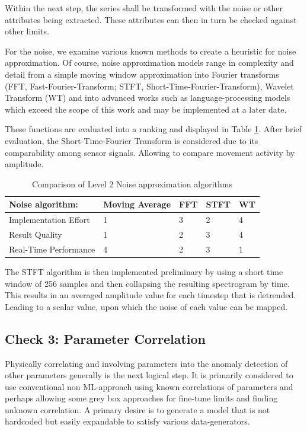 Within the next step, the series shall be transformed with the noise or other attributes being extracted. These attributes can then in turn be checked against other limits.

For the noise, we examine various known methods to create a heuristic for noise approximation. Of course, noise approximation models range in complexity and detail from a simple moving window approximation into Fourier transforms (FFT, Fast-Fourier-Transform; STFT, Short-Time-Fourier-Transform), Wavelet Transform (WT) and into advanced works such as language-processing models \cite{hendriks_noise_2008} which exceed the scope of this work and may be implemented at a later date.

These functions are evaluated into a ranking and displayed in Table \ref{tab:lvl2_comparison}. After brief evaluation, the Short-Time-Fourier Transform is considered due to its comparability among sensor signals. Allowing to compare movement activity by amplitude.

\begin{table}[]
    \centering
    \begin{tabular}{@{}lllll@{}}
        \toprule
        Noise algorithm:      & Moving Average & FFT & STFT & WT \\ \midrule
        Implementation Effort & 1              & 3   & 2    & 4  \\
        Result Quality        & 1              & 2   & 3    & 4  \\
        Real-Time Performance & 4              & 2   & 3    & 1  \\ \bottomrule
    \end{tabular}
    \caption{Comparison of Level 2 Noise approximation algorithms}
    \label{tab:lvl2_comparison}
\end{table}

The STFT algorithm is then implemented preliminary by using a short time window of 256 samples and then collapsing the resulting spectrogram by time. This results in an averaged amplitude value for each timestep that is detrended. Leading to a scalar value, upon which the noise of each value can be mapped.

\subsection{Check 3: Parameter Correlation}
Physically correlating and involving parameters into the anomaly detection of other parameters generally is the next logical step. It is primarily considered to use conventional non ML-approach using known correlations of parameters and perhaps allowing some grey box approaches for fine-tune limits and finding unknown correlation. A primary desire is to generate a model that is not hardcoded but easily expandable to satisfy various data-generators.


